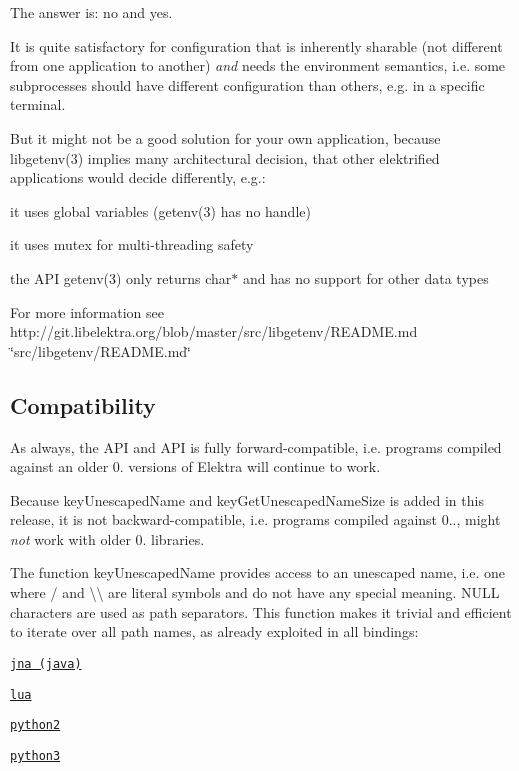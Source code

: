 The answer is\+: no and yes.

It is quite satisfactory for configuration that is inherently sharable (not different from one application to another) {\itshape and} needs the environment semantics, i.\+e. some subprocesses should have different configuration than others, e.\+g. in a specific terminal.

But it might not be a good solution for your own application, because libgetenv(3) implies many architectural decision, that other elektrified applications would decide differently, e.\+g.\+:


\begin{DoxyItemize}
\item it uses global variables (getenv(3) has no handle)
\item it uses mutex for multi-\/threading safety
\item the A\+P\+I getenv(3) only returns {\ttfamily char$\ast$} and has no support for other data types
\end{DoxyItemize}

For more information see http\+://git.libelektra.\+org/blob/master/src/libgetenv/\+R\+E\+A\+D\+M\+E.md \char`\"{}src/libgetenv/\+R\+E\+A\+D\+M\+E.\+md\char`\"{}

\subsection*{Compatibility}

As always, the A\+P\+I and A\+P\+I is fully forward-\/compatible, i.\+e. programs compiled against an older 0. versions of Elektra will continue to work.

Because {\ttfamily key\+Unescaped\+Name} and {\ttfamily key\+Get\+Unescaped\+Name\+Size} is added in this release, it is not backward-\/compatible, i.\+e. programs compiled against 0.., might {\itshape not} work with older 0. libraries.

The function {\ttfamily key\+Unescaped\+Name} provides access to an unescaped name, i.\+e. one where {\ttfamily /} and {\ttfamily \textbackslash{}\textbackslash{}} are literal symbols and do not have any special meaning. {\ttfamily N\+U\+L\+L} characters are used as path separators. This function makes it trivial and efficient to iterate over all path names, as already exploited in all bindings\+:


\begin{DoxyItemize}
\item \href{http://git.libelektra.org/blob/master/src/bindings/jna/HelloElektra.java}{\tt jna (java)}
\item \href{http://git.libelektra.org/blob/master/src/bindings/swig/lua/tests/test_key.lua}{\tt lua}
\item \href{http://git.libelektra.org/blob/master/src/bindings/swig/python2/tests/testpy2_key.py}{\tt python2}
\item \href{http://git.libelektra.org/blob/master/src/bindings/swig/python3/tests/test_key.py}{\tt python3}
\end{DoxyItemize}

